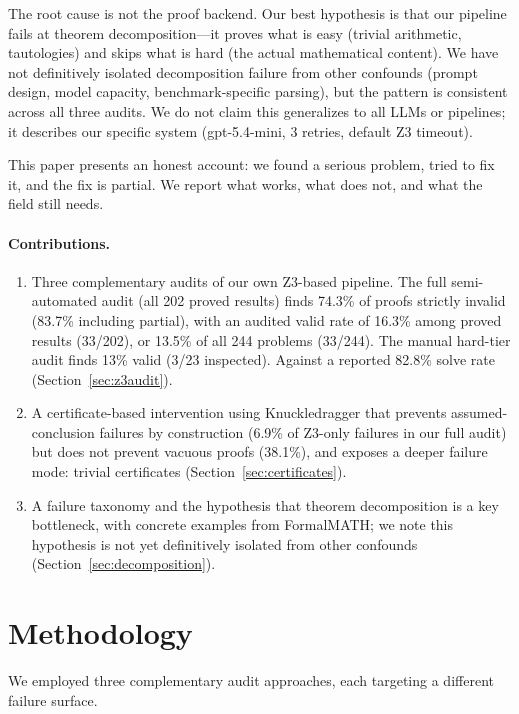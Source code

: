 \documentclass[11pt]{article}
\begin{document}
The root cause is not the proof backend. Our best hypothesis is that our pipeline fails at theorem decomposition---it proves what is easy (trivial arithmetic, tautologies) and skips what is hard (the actual mathematical content). We have not definitively isolated decomposition failure from other confounds (prompt design, model capacity, benchmark-specific parsing), but the pattern is consistent across all three audits. We do not claim this generalizes to all LLMs or pipelines; it describes our specific system (gpt-5.4-mini, 3 retries, default Z3 timeout).

This paper presents an honest account: we found a serious problem, tried to fix it, and the fix is partial. We report what works, what does not, and what the field still needs.

\paragraph{Contributions.}
\begin{enumerate}[leftmargin=*,itemsep=2pt]
    \item Three complementary audits of our own Z3-based pipeline. The full semi-automated audit (all 202 proved results) finds 74.3\% of proofs strictly invalid (83.7\% including partial), with an audited valid rate of 16.3\% among proved results (33/202), or 13.5\% of all 244 problems (33/244). The manual hard-tier audit finds 13\% valid (3/23 inspected). Against a reported 82.8\% solve rate (Section~\ref{sec:z3audit}).
    \item A certificate-based intervention using Knuckledragger that prevents assumed-conclusion failures by construction (6.9\% of Z3-only failures in our full audit) but does not prevent vacuous proofs (38.1\%), and exposes a deeper failure mode: trivial certificates (Section~\ref{sec:certificates}).
    \item A failure taxonomy and the hypothesis that theorem decomposition is a key bottleneck, with concrete examples from FormalMATH; we note this hypothesis is not yet definitively isolated from other confounds (Section~\ref{sec:decomposition}).
\end{enumerate}

\section{Methodology}\label{sec:methodology}

We employed three complementary audit approaches, each targeting a different failure surface.
\end{document}
